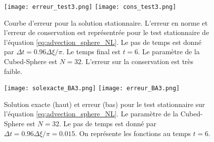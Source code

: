 \begin{figure}[htbp]
\begin{center}
\texttt{[image: erreur\_test3.png]}
\texttt{[image: cons\_test3.png]}
\end{center}
\caption{Courbe d'erreur pour la solution stationnaire. L'erreur en norme et l'erreur de conservation est représentrée pour le test stationnaire de l'équation \eqref{eq:advection_sphere_NL}. Le pas de temps est donné par $\Delta t = 0.96 \Delta \xi / \pi$. Le temps final est $t=6$. Le paramètre de la Cubed-Sphere est $N=32$. L'erreur sur la conservation est très faible.}
\label{fig:benartzi_test3_hist}
\end{figure}

\begin{figure}[htbp]
\begin{center}
\texttt{[image: solexacte\_BA3.png]}
\texttt{[image: erreur\_BA3.png]}
\end{center}
\caption{Solution exacte (haut) et erreur (bas) pour le test stationnaire sur l'équation \eqref{eq:advection_sphere_NL}. Le paramètre de la Cubed-Sphere est $N=32$. Le pas de temps est donné par $\Delta t = 0.96 \Delta \xi / \pi = 0.015$. On représente les fonctions au temps $t=6$.}
\label{fig:benartzi_test3_sol}
\end{figure}


















